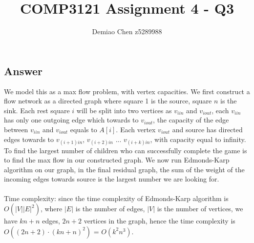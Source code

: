 \documentclass[12pt]{article}
\title{COMP3121 Assignment 4 - Q3}
\author{Demiao Chen z5289988}
\begin{document}
\maketitle
{}

\subsection*{Answer}
We model this as a max flow problem, with vertex capacities. We first construct a 
flow network as a directed graph where square 1 is the source, square $n$ is the 
sink. Each rest square $i$ will be split into two vertices as $v_{iin}$ and $v_{iout}$,
each $v_{iin}$ has only one outgoing edge which towards to $v_{iout}$, the capacity of 
the edge between $v_{iin}$ and $v_{iout}$ equals to $A[i]$. Each vertex $v_{iout}$ and source
has directed edges towards to $v_{(i+1)in}$,  $v_{(i+2)in}$ ...  $v_{(i+k)in}$, with
capacity equal to infinity.\\
To find the largest number of children who can successfully complete the game
is to find the max flow in our constructed graph. We now run Edmonds-Karp algorithm
on our graph, in the final residual graph, the sum of the weight of the incoming 
edges towards source is the largest number we are looking for.\\\\
Time complexity: since the time complexity of Edmonds-Karp algorithm is 
$O(|V||E|^2)$, where $|E|$ is the number of edges, $|V|$ is the number of 
vertices, we have $k n + n$ edges, $2n + 2$ vertices in the graph, 
hence the time complexity is $O((2n+2)\cdot(kn+n)^2)$ = $O(k^2n^3)$.
\end{document}

